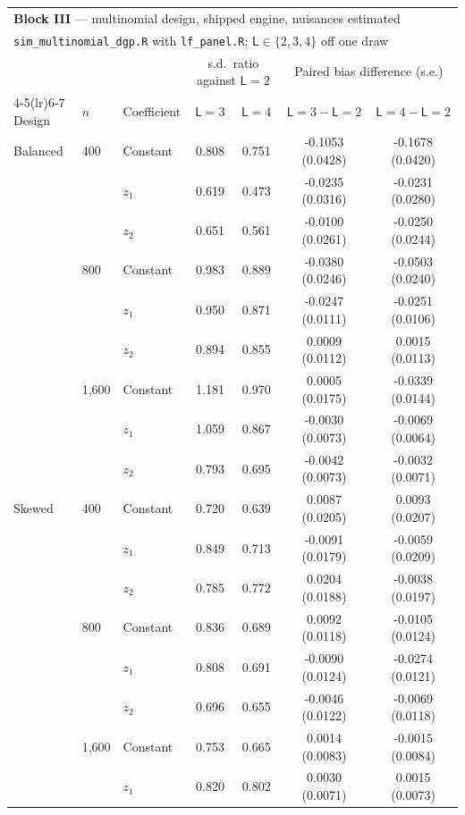 \begin{tabular}{lllcccc}
\toprule
\multicolumn{7}{l}{\textbf{Block III} --- multinomial design, shipped engine, nuisances estimated} \\
\multicolumn{7}{l}{\quad \texttt{sim\_multinomial\_dgp.R} with \texttt{lf\_panel.R}; $\mathsf L\in\{2,3,4\}$ off one draw} \\
\midrule
& & & \multicolumn{2}{c}{s.d.\ ratio against $\mathsf L=2$} & \multicolumn{2}{c}{Paired bias difference (s.e.)} \\
\cmidrule(lr){4-5}\cmidrule(lr){6-7}
Design & $n$ & Coefficient & $\mathsf L=3$ & $\mathsf L=4$ & $\mathsf L=3-\mathsf L=2$ & $\mathsf L=4-\mathsf L=2$ \\
\midrule
Balanced & 400 & Constant & 0.808 & 0.751 & -0.1053 (0.0428) & -0.1678 (0.0420) \\
 &  & $z_1$ & 0.619 & 0.473 & -0.0235 (0.0316) & -0.0231 (0.0280) \\
 &  & $z_2$ & 0.651 & 0.561 & -0.0100 (0.0261) & -0.0250 (0.0244) \\
 & 800 & Constant & 0.983 & 0.889 & -0.0380 (0.0246) & -0.0503 (0.0240) \\
 &  & $z_1$ & 0.950 & 0.871 & -0.0247 (0.0111) & -0.0251 (0.0106) \\
 &  & $z_2$ & 0.894 & 0.855 & 0.0009 (0.0112) & 0.0015 (0.0113) \\
 & 1,600 & Constant & 1.181 & 0.970 & 0.0005 (0.0175) & -0.0339 (0.0144) \\
 &  & $z_1$ & 1.059 & 0.867 & -0.0030 (0.0073) & -0.0069 (0.0064) \\
 &  & $z_2$ & 0.793 & 0.695 & -0.0042 (0.0073) & -0.0032 (0.0071) \\
\addlinespace
Skewed & 400 & Constant & 0.720 & 0.639 & 0.0087 (0.0205) & 0.0093 (0.0207) \\
 &  & $z_1$ & 0.849 & 0.713 & -0.0091 (0.0179) & -0.0059 (0.0209) \\
 &  & $z_2$ & 0.785 & 0.772 & 0.0204 (0.0188) & -0.0038 (0.0197) \\
 & 800 & Constant & 0.836 & 0.689 & 0.0092 (0.0118) & -0.0105 (0.0124) \\
 &  & $z_1$ & 0.808 & 0.691 & -0.0090 (0.0124) & -0.0274 (0.0121) \\
 &  & $z_2$ & 0.696 & 0.655 & -0.0046 (0.0122) & -0.0069 (0.0118) \\
 & 1,600 & Constant & 0.753 & 0.665 & 0.0014 (0.0083) & -0.0015 (0.0084) \\
 &  & $z_1$ & 0.820 & 0.802 & 0.0030 (0.0071) & 0.0015 (0.0073) \\

\end{tabular}
